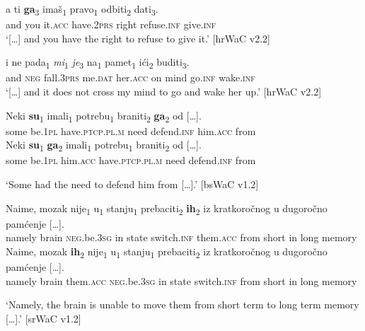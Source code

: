 \begin{exe}\ex\label{(11.18)}
\gll [\dots] a ti \textbf{ga}\textsubscript{3} imaš\textsubscript{1} pravo\textsubscript{1} odbiti\textsubscript{2} dati\textsubscript{3}. \\
{} and you it.\textsc{acc} have.2\textsc{prs} right refuse.\textsc{inf} give.\textsc{inf} \\
\glt ‘[\dots] and you have the right to refuse to give it.’
\hfill [hrWaC v2.2]

\ex\label{(11.19)}
\gll [\dots] i ne pada\textsubscript{1} \textit{mi}\textsubscript{1} \textit{je}\textsubscript{3} na\textsubscript{1} pamet\textsubscript{1} ići\textsubscript{2} buditi\textsubscript{3}.\\
{} and \textsc{neg} fall.3\textsc{prs} me.\textsc{dat} her.\textsc{acc} on mind go.\textsc{inf} wake.\textsc{inf}\\
\glt ‘[\dots] and it does not cross my mind to go and wake her up.’
\hfill [hrWaC v2.2]


\ex
\begin{xlist}
\ex\label{(11.20a)}
\gll Neki \textbf{su}\textsubscript{1} imali\textsubscript{1} potrebu\textsubscript{1} braniti\textsubscript{2} \textbf{ga}\textsubscript{2} {od [\dots].} \\
some be.1\textsc{pl} have.\textsc{ptcp}.\textsc{pl}.\textsc{m} need defend.\textsc{inf} him.\textsc{acc} from \\
\ex\label{(11.20b)}
\gll Neki \textbf{su}\textsubscript{1} \textbf{ga}\textsubscript{2} imali\textsubscript{1} potrebu\textsubscript{1} braniti\textsubscript{2} {od [\dots].} \\
some be.1\textsc{pl} him.\textsc{acc} have.\textsc{ptcp}.\textsc{pl}.\textsc{m} need defend.\textsc{inf} from \\
\end{xlist}
\glt ‘Some had the need to defend him from [\dots].’
\hfill [bsWaC v1.2]

\ex
\begin{xlist}
\ex\label{(11.21a)}
\gll Naime, mozak nije\textsubscript{1} u\textsubscript{1} stanju\textsubscript{1} prebaciti\textsubscript{2} \textbf{ih}\textsubscript{2} iz kratkoročnog u dugoročno {pamćenje [\dots].} \\
namely brain \textsc{neg}.be.3\textsc{sg} in state switch.\textsc{inf} them.\textsc{acc} from short in long memory \\
\glt 
\ex\label{(11.21b)}
\gll Naime, mozak \textbf{ih}\textsubscript{2} nije\textsubscript{1} u\textsubscript{1} stanju\textsubscript{1} prebaciti\textsubscript{2} iz kratkoročnog u dugoročno {pamćenje [\dots].} \\
namely brain them.\textsc{acc} \textsc{neg}.be.3\textsc{sg} in state switch.\textsc{inf}  from short in long memory \\
\end{xlist}
\glt ‘Namely, the brain is unable to move them from short term to long term memory [\dots].’
\hfill [srWaC v1.2] 
\end{exe}

